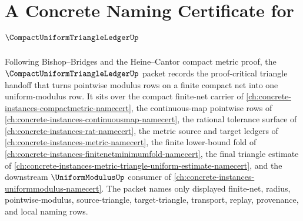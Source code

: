 \chapter{A Concrete Naming Certificate for $\CompactUniformTriangleLedgerUp$}
\label{ch:concrete-instances-compact-uniform-triangle-ledger-namecert}

Following Bishop--Bridges and the Heine--Cantor compact metric proof, the $\CompactUniformTriangleLedgerUp$ packet records the proof-critical triangle handoff that turns pointwise modulus rows on a finite compact net into one uniform-modulus row. It sits over the compact finite-net carrier of \autoref{ch:concrete-instances-compactmetric-namecert}, the continuous-map pointwise rows of \autoref{ch:concrete-instances-continuousmap-namecert}, the rational tolerance surface of \autoref{ch:concrete-instances-rat-namecert}, the metric source and target ledgers of \autoref{ch:concrete-instances-metric-namecert}, the finite lower-bound fold of \autoref{ch:concrete-instances-finitenetminimumfold-namecert}, the final triangle estimate of \autoref{ch:concrete-instances-metric-triangle-uniform-estimate-namecert}, and the downstream $\UniformModulusUp$ consumer of \autoref{ch:concrete-instances-uniformmodulus-namecert}. The packet names only displayed finite-net, radius, pointwise-modulus, source-triangle, target-triangle, transport, replay, provenance, and local naming rows.

